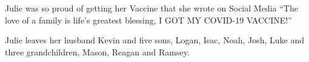 Julie was so proud of getting her Vaccine that she wrote on Social Media “The
love of a family is life’s greatest blessing, I GOT MY COVID-19 VACCINE!”

Julie leaves her husband Kevin and five sons, Logan, Isac, Noah, Josh, Luke and
three grandchildren, Mason, Reagan and Ramsey.

